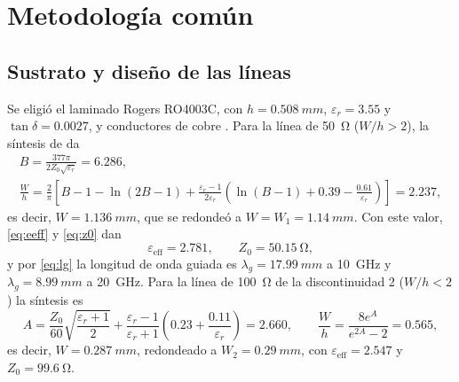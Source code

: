 \section{Metodología común}

\subsection{Sustrato y diseño de las líneas}
\label{sec:diseno}
Se eligió el laminado Rogers RO4003C, con $h=\SI{0.508}{mm}$, $\varepsilon_r=3.55$ y $\tan\delta=0.0027$, y conductores de cobre \cite{rogers}. Para la línea de \SI{50}{\ohm} ($W/h>2$), la síntesis de \cite{pozar} da
\begin{gather}
B = \frac{377\pi}{2Z_0\sqrt{\varepsilon_r}} = 6.286, \nonumber\\[4pt]
\frac{W}{h} = \frac{2}{\pi}\left[B-1-\ln(2B-1)+\frac{\varepsilon_r-1}{2\varepsilon_r}\left(\ln(B-1)+0.39-\frac{0.61}{\varepsilon_r}\right)\right] = 2.237,
\label{eq:sintesis}
\end{gather}
es decir, $W=\SI{1.136}{mm}$, que se redondeó a $W=W_1=\SI{1.14}{mm}$. Con este valor, \eqref{eq:eeff} y \eqref{eq:z0} dan
\[
\varepsilon_{\mathrm{eff}} = 2.781, \qquad Z_0 = \SI{50.15}{\ohm},
\]
y por \eqref{eq:lg} la longitud de onda guiada es $\lambda_g=\SI{17.99}{mm}$ a \SI{10}{GHz} y $\lambda_g=\SI{8.99}{mm}$ a \SI{20}{GHz}. Para la línea de \SI{100}{\ohm} de la discontinuidad 2 ($W/h<2$) la síntesis es
\begin{equation}
A = \frac{Z_0}{60}\sqrt{\frac{\varepsilon_r+1}{2}} + \frac{\varepsilon_r-1}{\varepsilon_r+1}\left(0.23+\frac{0.11}{\varepsilon_r}\right) = 2.660, \qquad
\frac{W}{h} = \frac{8e^A}{e^{2A}-2} = 0.565,
\label{eq:sintesis100}
\end{equation}
es decir, $W=\SI{0.287}{mm}$, redondeado a $W_2=\SI{0.29}{mm}$, con $\varepsilon_{\mathrm{eff}}=2.547$ y $Z_0=\SI{99.6}{\ohm}$.

